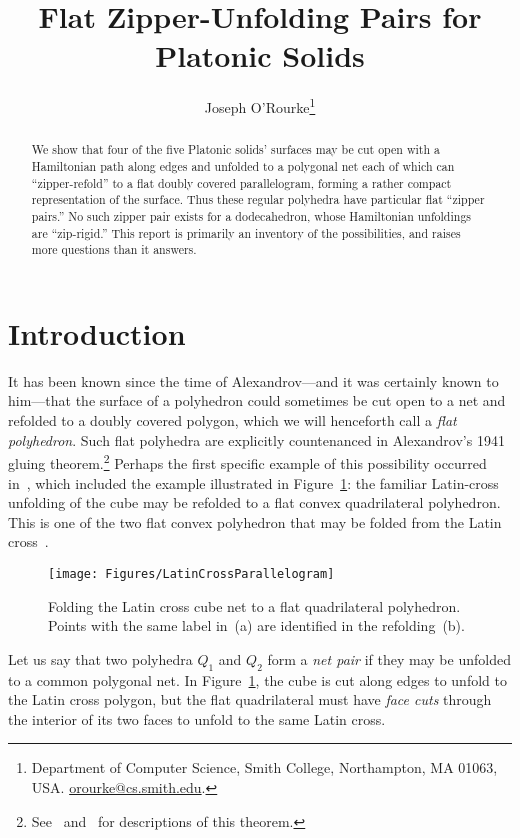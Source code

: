 \pdfoutput=1  \documentclass[]{article}
\title{Flat Zipper-Unfolding Pairs
for Platonic Solids
}
\author{Joseph O'Rourke\thanks{Department of Computer Science, Smith College, Northampton, MA
      01063, USA.
      \protect\url{orourke@cs.smith.edu}.}
}
\newcommand{\figlab}[1]{\label{fig:#1}}
\newcommand{\seclab}[1]{\label{sec:#1}}
\newcommand{\figref}[1]{\ref{fig:#1}}
\begin{document}
\maketitle

\begin{abstract}
We show that four of the five Platonic solids' surfaces may be cut open
with
a Hamiltonian path along edges and unfolded to a polygonal net
each of which can ``zipper-refold'' to a flat doubly covered
parallelogram,
forming a rather
compact representation of the surface.
Thus these regular polyhedra have particular flat ``zipper pairs.''
No such zipper pair exists for a dodecahedron, whose Hamiltonian
unfoldings are ``zip-rigid.''
This report is primarily an inventory of the possibilities, and raises
more questions than it answers.
\end{abstract}

\section{Introduction}
\seclab{Introduction}
It has been known since the time of Alexandrov---and it was certainly
known to him---that the surface of a polyhedron could sometimes be cut
open to a net and refolded to a doubly covered polygon, which we will
henceforth call a \emph{flat polyhedron}.
Such flat polyhedra are explicitly countenanced in Alexandrov's 1941
gluing theorem.\footnote{
See~\cite[Sec.~23.3]{do-gfalop-07}
and~\cite[Sec.~37]{p-ldpg-10} for descriptions of this theorem.
}
Perhaps the first specific example of this possibility occurred in~\cite{lo-wcpfp-96},
which included the example illustrated in
Figure~\figref{LatinCrossParallelogram}:
the familiar Latin-cross unfolding of the cube may be refolded to a
flat convex quadrilateral polyhedron.
This is one of the two flat convex polyhedron that may be folded
from
the Latin cross~\cite[Fig.~25.32]{do-gfalop-07}.
\begin{figure}[htbp]
\centering
\texttt{[image: Figures/LatinCrossParallelogram]}
\caption{Folding the Latin cross cube net to a flat
  quadrilateral polyhedron.
Points with the same label in~(a) are identified in the refolding~(b).}
\figlab{LatinCrossParallelogram}
\end{figure}


Let us say that two polyhedra $Q_1$ and $Q_2$ form a \emph{net pair}
if they may be unfolded to a common polygonal net.
In Figure~\figref{LatinCrossParallelogram}, the cube is cut along
edges to unfold to the Latin cross polygon,
but the flat quadrilateral must have \emph{face cuts} through the interior
of its two faces to unfold to the same Latin cross.
\end{document}
